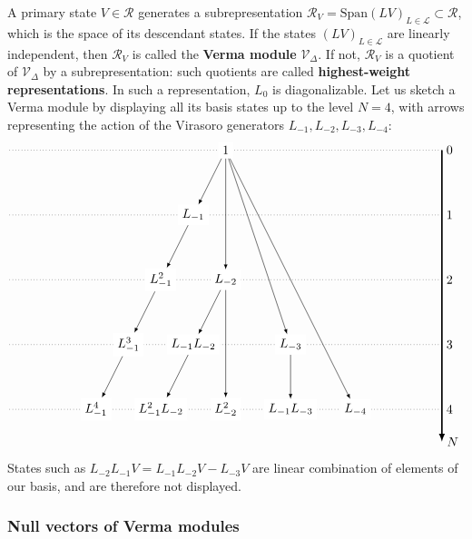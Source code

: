 \documentclass[12pt, a4paper]{article}
\newcommand{\myindex}[1]{\textbf{\boldmath #1}}
\begin{document}
A primary state $V{} \in \mathcal{R}$ generates a subrepresentation $\mathcal{R}_{V{}}= \text{Span}(LV{})_{L\in\mathcal{L}}\subset\mathcal{R}$, which is the space of its descendant states. If the states $(LV{})_{L\in\mathcal{L}}$ are linearly independent, then $\mathcal{R}_{V{}}$ is called the \myindex{Verma module} $\mathcal{V}_\Delta$. If not, $\mathcal{R}_{V{}}$ is a quotient of $\mathcal{V}_\Delta$ by a subrepresentation: such quotients are called \myindex{highest-weight representations}. In such a representation, $L_0$ is diagonalizable. 
Let us sketch a Verma module by displaying all its basis states up to the level $N=4$, with arrows representing the action of the Virasoro generators $L_{-1},L_{-2},L_{-3},L_{-4}$:
 \begin{align}
 \begin{tikzpicture}[scale = .3, baseline=(current  bounding  box.center)]
  \draw[-latex, very thick] (20, 0) -- (20, -27) node [right] {$N$};
  \foreach \x in {0, ..., 4}
  {
  \draw [dotted] (-20, {-6*\x}) -- (20, {-6*\x}) node [right] {${\x}$};
  }
  \node[fill = white] at (0, 0) (0) {$1$};
  \node[fill = white] at (-3,-6) (1) {$L_{-1}$};
  \node[fill = white] at (-6, -12) (11) {$L_{-1}^2$};
  \node[fill = white] at (-9, -18) (111) {$L_{-1}^3$};
  \node[fill = white] at (-12, -24) (1111) {$L_{-1}^4$};
  \node[fill = white] at (0,-12) (2) {$L_{-2}$};
  \node[fill = white] at (-3,-18) (12) {$L_{-1}L_{-2}$};
  \node[fill = white] at (-6,-24) (112) {$L_{-1}^2L_{-2}$};
  \node[fill = white] at (0,-24) (22) {$L_{-2}^2$};
  \node[fill = white] at (6,-18) (3) {$L_{-3}$};
  \node[fill = white] at (6,-24) (13) {$L_{-1}L_{-3}$};
  \node[fill = white] at (12,-24) (4) {$L_{-4}$};
  \draw[-latex] (0) -- (1);
  \draw[-latex] (1) -- (11);
  \draw[-latex] (11) -- (111);
  \draw[-latex] (111) -- (1111);
  \draw[-latex] (0) -- (2);
  \draw[-latex] (0) -- (3);
  \draw[-latex] (0) -- (4);
  \draw[-latex] (2) -- (12);
  \draw[-latex] (12) -- (112);
  \draw[-latex] (2) -- (22);
  \draw[-latex] (3) -- (13);
 \end{tikzpicture}
 \label{verma}
\end{align}
States such as 
$L_{-2}L_{-1}V = L_{-1}L_{-2}V -L_{-3}V$ are linear combination of elements of our basis, and are therefore not displayed.

\subsubsection{Null vectors of Verma modules}\label{sec:nvvm}
\end{document}
